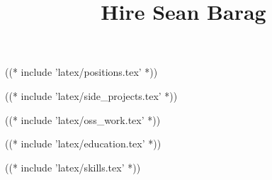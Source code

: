 \documentclass[10pt]{barag_resume}
\title{Hire Sean Barag}
\begin{document}
    ((* include 'latex/positions.tex' *))

    \newpage %
    ((* include 'latex/side_projects.tex' *))

    ((* include 'latex/oss_work.tex' *))

    ((* include 'latex/education.tex' *))

    ((* include 'latex/skills.tex' *))
\end{document}
